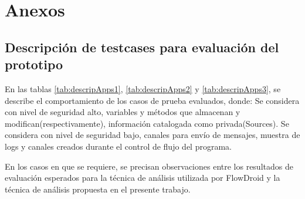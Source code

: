 \label{ch:anexos}
\chapter{Anexos}

\section{Descripción de testcases para evaluación del prototipo}
\label{tb:muestra-descripApps}
\label{sec:testcases}
En las tablas \ref{tab:descripApps1}, \ref{tab:descripApps2} y
\ref{tab:descripApps3}, se describe el comportamiento de los casos de prueba
evaluados, donde:\newline 
Se considera con nivel de seguridad alto, variables y métodos que almacenan y
modifican(respectivamente), información catalogada como privada(Sources).\newline 
Se considera con nivel de seguridad bajo, canales para envío de mensajes,
muestra de logs y canales creados durante el control de flujo del programa.

En los casos en que se requiere, se precisan observaciones entre los
resultados de evaluación esperados para la técnica de análisis utilizada por
FlowDroid y la técnica de análisis propuesta en el presente trabajo.

